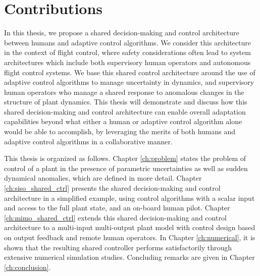 \section{Contributions}

In this thesis, we propose a shared decision-making and control architecture between humans and adaptive control algorithms. We consider this architecture in the context of flight control, where safety considerations often lead to system architectures which include both supervisory human operators and autonomous flight control systems. We base this shared control architecture around the use of adaptive control algorithms to manage uncertainty in dynamics, and supervisory human operators who manage a shared response to anomalous changes in the structure of plant dynamics. This thesis will demonstrate and discuss how this shared decision-making and control architecture can enable overall adaptation capabilities beyond what either a human or adaptive control algorithm alone would be able to accomplish, by leveraging the merits of both humans and adaptive control algorithms in a collaborative manner. 

This thesis is organized as follows. Chapter \ref{ch:problem} states the problem of control of a plant in the presence of parametric uncertainties as well as sudden dynamical anomalies, which are defined in more detail. Chapter \ref{ch:siso_shared_ctrl} presents the shared decision-making and control architecture in a simplified example, using control algorithms with a scalar input and access to the full plant state, and an on-board human pilot. Chapter \ref{ch:mimo_shared_ctrl} extends this shared decision-making and control architecture to a multi-input multi-output plant model with control design based on output feedback and remote human operators. In Chapter \ref{ch:numerical}, it is shown that the resulting shared controller performs satisfactorily through extensive numerical simulation studies. Concluding remarks are given in Chapter \ref{ch:conclusion}.

